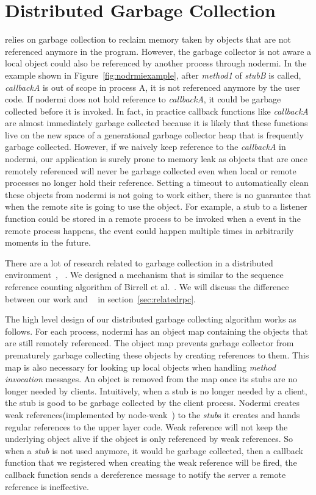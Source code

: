 \section{Distributed Garbage Collection}
\js{} relies on garbage collection to reclaim memory taken by
objects that are not referenced anymore in the program.
However, the garbage collector is not aware a local object
could also be referenced by another process through nodermi.
In the example shown in Figure~\ref{fig:nodrmiexample},
after \emph{method1} of \emph{stubB} is called,
\emph{callbackA} is out of scope in process A,
it is not referenced anymore by the user code.
If nodermi does not hold reference to \emph{callbackA},
it could be garbage collected before it is invoked.
In fact, in practice callback functions like \emph{callbackA} are almost
immediately garbage collected because it is likely that these functions
live on the new space of a generational garbage collector heap that is frequently
garbage collected.
However, if we naively keep reference to the \emph{callbackA} in nodermi,
our application is surely prone to memory leak as objects that are once remotely
referenced
will never be garbage collected even when local or remote processes no longer hold their reference.
Setting a timeout to automatically clean these objects from nodermi
 is not going to work either,
there is no guarantee that when the remote site is going to use the object.
For example,
a stub to a listener function could be stored in a remote process
to be invoked when a event in the remote process happens,
the event could happen multiple times in arbitrarily moments in the future.


There are a lot of research related to garbage collection in a distributed
environment~\cite{abdullahi1998garbage}, ~\cite{birrell1993distributed}.
We designed a mechanism that is similar to the sequence reference counting algorithm
of Birrell et al.~\cite{birrell1993distributed}.
We will discuss the difference between our work and ~\cite{birrell1993distributed}
in section~\ref{sec:relatedrpc}.

The high level design of our distributed garbage collecting 
algorithm works as follows.
For each process, nodermi has an object map containing the objects 
that are still remotely referenced.
The object map prevents garbage collector from prematurely garbage collecting
these objects by creating references to them.
This map is also necessary for looking up local objects 
when handling \emph{method invocation} messages.
An object is removed from the map once its stubs
are no longer needed by clients.
Intuitively,
when a stub is no longer needed by a client,
the stub is good to be garbage collected by the client process.
Nodermi creates weak references(implemented by node-weak~\cite{nodeweak}) 
to the \emph{stub}s it creates
and hands regular references to the upper layer code.
Weak reference will not keep the underlying object alive
if the object is only referenced by weak references.
So when a \emph{stub} is not used anymore,
it would be garbage collected,
then a callback function that we registered when creating the weak
reference will be fired,
the callback function sends a dereference message to notify the server
a remote reference is ineffective.


